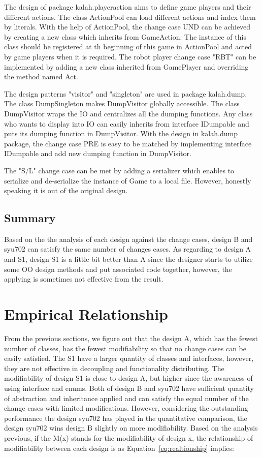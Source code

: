 \documentclass[conference]{IEEEtran}
\begin{document}
	The design of package kalah.playeraction aims to define game players and their different actions. The class ActionPool can load different actions and index them by literals. With the help of ActionPool, the change case UND can be achieved by creating a new class which inherits from GameAction. The instance of this class should be registered at th beginning of this game in ActionPool and acted by game players when it is required. The robot player change case "RBT" can be implemented by adding a new class inherited from GamePlayer and overriding the method named Act.
	
	The design patterns "visitor" and "singleton" are used in package kalah.dump. The class DumpSingleton makes DumpVisitor globally accessible. The class DumpVisitor wraps the IO and centralizes all the dumping functions. Any class who wants to display into IO can easily inherits from interface IDumpable and puts its dumping function in DumpVisitor. With the design in kalah.dump package, the change case PRE is easy to be matched by implementing interface IDumpable and add new dumping function in DumpVisitor.
	
	The "S/L" change case can be met by adding a serializer which enables to serialize and de-serialize the instance of Game to a local file. However, honestly speaking it is out of the original design.
	
	\subsection{Summary}
	Based on the the analysis of each design against the change cases, design B and syu702 can satisfy the same number of changes cases. As regarding to design A and S1, design S1 is a little bit better than A since the designer starts to utilize some \gls{OO} design methods and put associated code together, however, the applying is sometimes not effective from the result.
	
	\section{Empirical Relationship}
	From the previous sections, we figure out that the design A, which has the fewest number of classes, has the fewest modifiability so that no change cases can be easily satisfied. The S1 have a larger quantity of classes and interfaces, however, they are not effective in decoupling and functionality distributing. The modifiability of design S1 is close to design A, but higher since the awareness of using interface and enums. Both of design B and syu702 have sufficient quantity of abstraction and inheritance applied and can satisfy the equal number of the change cases with limited modifications. However, considering the outstanding performance the design syu702 has played in the quantitative comparison, the design syu702 wins design B slightly on more modifiability.
	Based on the analysis previous, if the M(x) stands for the modifiability of design x, the relationship of modifiability between each design is as Equation~\ref{eq:realtionship} implies:
	
\end{document}
